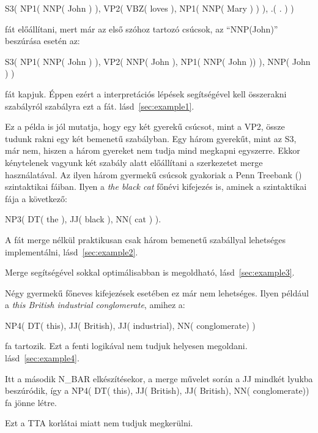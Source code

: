 S3( NP1( NNP( John ) ), VP2( VBZ( loves ),  NP1( NNP( Mary ) ) ), .( . ) )

fát előállítani, mert már az első szóhoz tartozó csúcsok, az “NNP(John)” beszúrása esetén az:

S3( NP1( NNP( John ) ), VP2( NNP( John ),  NP1( NNP( John )) ), NNP( John ) )

fát kapjuk. 
Éppen ezért a interpretációs lépések segítségével kell összerakni szabályról szabályra ezt a fát. 
lásd~\ref{sec:example1}.

Ez a példa is jól mutatja, hogy egy két gyerekű csúcsot, mint a VP2, össze tudunk rakni egy két bemenetű szabályban. Egy három gyerekűt, mint az S3, már nem, hiszen a három gyereket nem tudja mind megkapni egyszerre. Ekkor kénytelenek vagyunk két szabály alatt előállítani a szerkezetet merge használatával. Az ilyen három gyermekű csúcsok gyakoriak a Penn Treebank (\cite{Marcus:1993}) szintaktikai fáiban.  Ilyen a \textit{the black cat} főnévi kifejezés is, aminek a szintaktikai fája a következő:

NP3( DT( the ), JJ( black ), NN( cat ) ).

A fát merge nélkül praktikusan csak három bemenetű szabállyal lehetséges implementálni, lásd~\ref{sec:example2}.

Merge segítségével sokkal optimálisabban is megoldható, lásd~\ref{sec:example3}.

Négy gyermekű főneves kifejezések esetében ez már nem lehetséges. 
Ilyen például a \textit{this British industrial conglomerate}, amihez  a:

NP4( DT( this), JJ( British), JJ( industrial), NN( conglomerate) )

fa tartozik. Ezt a fenti logikával nem tudjuk helyesen megoldani. lásd~\ref{sec:example4}.

Itt a második N\_BAR elkészítésekor, a merge művelet során a JJ  mindkét lyukba beszúródik, így a NP4( DT( this), JJ( British), JJ( British), NN( conglomerate)) fa jönne létre.

Ezt a TTA korlátai miatt nem tudjuk megkerülni.



